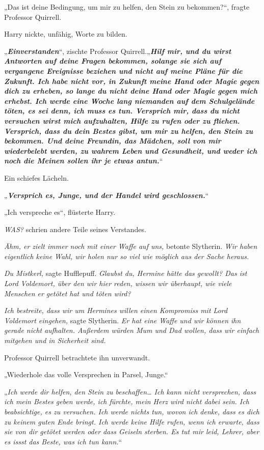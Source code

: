{„Das ist deine Bedingung, um mir zu helfen, den Stein zu bekommen?“, fragte Professor Quirrell.

Harry nickte, unfähig, Worte zu bilden.

„\textbf{\emph{Einverstanden}}“, zischte Professor Quirrell.„\textbf{\emph{Hilf mir, und du wirst Antworten auf deine Fragen bekommen, solange sie sich auf vergangene Ereignisse beziehen und nicht auf meine Pläne für die Zukunft. Ich habe nicht vor, in Zukunft meine Hand oder Magie gegen dich zu erheben, so lange du nicht deine Hand oder Magie gegen mich erhebst. Ich werde eine Woche lang niemanden auf dem Schulgelände töten, es sei denn, ich muss es tun. Versprich mir, dass du nicht versuchen wirst mich aufzuhalten, Hilfe zu rufen oder zu fliehen. Versprich, dass du dein Bestes gibst, um mir zu helfen, den Stein zu bekommen. Und deine Freundin, das Mädchen, soll von mir wiederbelebt werden, zu wahrem Leben und Gesundheit, und weder ich noch die Meinen sollen ihr je etwas antun.}}“

Ein schiefes Lächeln.

„\textbf{\emph{Versprich es, Junge, und der Handel wird geschlossen.}}“

„Ich verspreche es“, flüsterte Harry.

\emph{WAS?} schrien andere Teile seines Verstandes.

\emph{Ähm, er zielt immer noch mit einer Waffe auf uns,} betonte Slytherin. \emph{Wir haben eigentlich keine Wahl, wir holen nur so viel wie möglich aus der Sache heraus.}

\emph{Du Mistkerl,} sagte Hufflepuff. \emph{Glaubst du, Hermine hätte das gewollt? Das ist Lord Voldemort, über den wir hier reden, wissen wir überhaupt, wie viele Menschen er getötet hat und töten wird?}

\emph{Ich bestreite, dass wir um Hermines willen einen Kompromiss mit Lord Voldemort eingehen,} sagte Slytherin. \emph{Er hat eine Waffe und wir können ihn gerade nicht} \emph{aufhalten. Außerdem würden Mum und Dad wollen, dass wir einfach mitgehen und in Sicherheit sind.}

Professor Quirrell betrachtete ihn unverwandt.

„Wiederhole das volle Versprechen in Parsel, Junge.“

„\emph{Ich werde dir helfen, den Stein zu beschaffen… Ich kann nicht versprechen, dass ich mein Bestes geben werde, ich fürchte, mein Herz wird nicht dabei sein. Ich beabsichtige, es zu versuchen. Ich werde nichts tun, wovon ich denke, dass es dich zu keinem guten Ende bringt. Ich werde keine Hilfe rufen, wenn ich erwarte, dass sie von dir getötet werden oder dass Geiseln sterben. Es tut mir leid, Lehrer, aber es issst das Beste, was ich tun kann.}“

}
